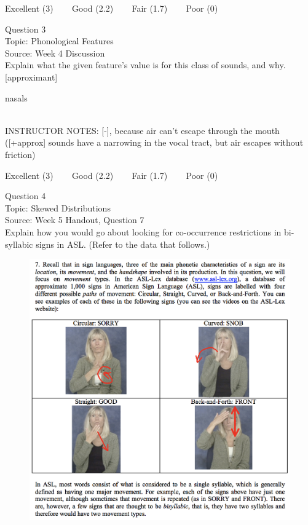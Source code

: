 \documentclass[12pt]{article}
\begin{document}
\vfill
Excellent (3) ~~~ Good (2.2) ~~~ Fair (1.7) ~~~ Poor (0)
\newpage

{\large Question 3}\\

Topic: Phonological Features\\
Source: Week 4 Discussion\\

Explain what the given feature’s value is for this class of sounds, and why.\\

{[approximant]}

nasals


~\\
INSTRUCTOR NOTES: [-], because air can't escape through the mouth ([+approx] sounds have a narrowing in the vocal tract, but air escapes without friction)


\vfill
Excellent (3) ~~~ Good (2.2) ~~~ Fair (1.7) ~~~ Poor (0)
\newpage

{\large Question 4}\\

Topic: Skewed Distributions\\
Source: Week 5 Handout, Question 7\\

Explain how you would go about looking for co-occurrence restrictions in bi-syllabic signs in ASL. (Refer to the data that follows.)\\

\begin{figure}[H]
\includegraphics{../images/ASL_movement.png}
\end{figure}
\end{document}
